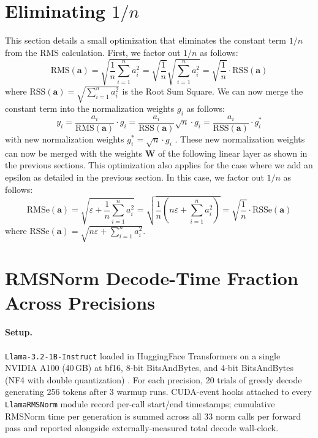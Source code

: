 \documentclass{article}
\newcommand{\mat}[1]{\mathbf{#1}}     %
\def\rms{\text{RMS}(\mathbf{a})}      %
\def\f1n{\frac{1}{n}}                 %
\def\sas{\sum_{i=1}^n a_i^2}           %
\def\a{\mathbf{a}}                    %
\begin{document}
\section{Eliminating $1/n$}
This section details a small optimization that eliminates the constant term $1/n$ from the RMS calculation. First, we factor out $1/n$ as follows:
\begin{equation*}
  \rms = \sqrt{\f1n \sas} = \sqrt{\f1n} \sqrt{\sas} = \sqrt{\f1n} \cdot \text{RSS}(\a)
\end{equation*}
where $\text{RSS}(\a) = \sqrt{\sas}$ is the Root Sum Square. We can now merge the constant term into the normalization weights $g_i$ as follows:
\begin{equation*}
  y_i = \frac{a_i}{\rms} \cdot g_i =
  \frac{a_i}{\text{RSS}(\a)} \sqrt{n} \cdot g_i =
  \frac{a_i}{\text{RSS}(\a)}          \cdot g_i^\ast
\end{equation*}
with new normalization weights $g_i^\ast = \sqrt{n} \cdot g_i$ . These new normalization weights can now be merged with the weights $\mat{W}$ of the following linear layer as shown in the previous sections. This optimization also applies for the case where we add an epsilon as detailed in the previous section. In this case, we factor out $1/n$ as follows:
\begin{equation*}
  \text{RMSe}(\a) = \sqrt{\varepsilon + \f1n \sas}
  = \sqrt{\f1n \left( n \varepsilon + \sas \right)}
  = \sqrt{\f1n} \cdot \text{RSSe}(\a)
\end{equation*}
where $\text{RSSe}(\a) = \sqrt{n \varepsilon + \sas}$.

\section{RMSNorm Decode-Time Fraction Across Precisions}\label{app:rmsnorm-fraction}

\paragraph{Setup.} \texttt{Llama-3.2-1B-Instruct} loaded in HuggingFace Transformers on a single NVIDIA A100 (40\,GB) at bf16, 8-bit BitsAndBytes, and 4-bit BitsAndBytes (NF4 with double quantization) \citep{bitsandbytes}. For each precision, 20 trials of greedy decode generating 256 tokens after 3 warmup runs. CUDA-event hooks attached to every \texttt{LlamaRMSNorm} module record per-call start/end timestamps; cumulative RMSNorm time per generation is summed across all 33 norm calls per forward pass and reported alongside externally-measured total decode wall-clock.
\end{document}
